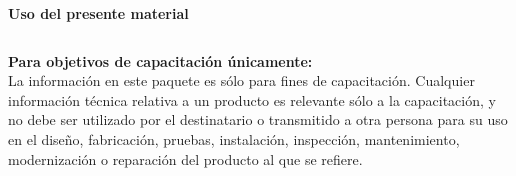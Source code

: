 \begin{frame}[t]{\textbf{Uso del presente material}}

    \begin{columns}[onlytextwidth]  %
        \textbf{Para objetivos de capacitación únicamente:}\\
        \vspace{0.5cm}               %
        \centering
        \justifying
        La información en este paquete es sólo para fines de capacitación.
        Cualquier información técnica relativa a un producto es relevante sólo
        a la capacitación, y no debe ser utilizado por el destinatario o
        transmitido a otra persona para su uso en el diseño, fabricación,
        pruebas, instalación, inspección, mantenimiento, modernización o
        reparación del producto al que se refiere.
    \end{columns}
\end{frame}


